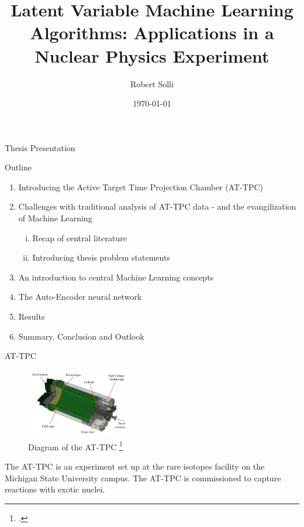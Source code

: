 \documentclass[notes]{beamer}
\title{Latent Variable Machine Learning Algorithms: Applications in a Nuclear Physics Experiment
}
\author{Robert Solli}
\institute{University of Oslo, Expert Analytics AS}
\date{\today}
\begin{document}
\begin{frame}[t]{Thesis Presentation}
	\titlepage
\end{frame}

\begin{frame}[t]{Outline}
	\begin{enumerate}
		\item Introducing the Active Target Time Projection Chamber (AT-TPC)
		\item Challenges with traditional analysis of AT-TPC data - and the evangilization of Machine Learning
			\begin{enumerate}[(i)]
				\item Recap of central literature 
				\item Introducing thesis problem statements
			\end{enumerate}
		\item An introduction to central Machine Learning concepts
		\item The Auto-Encoder neural network
		\item Results 
		\item Summary, Conclusion and Outlook
	\end{enumerate}
\end{frame}

\begin{frame}[t]{AT-TPC}
	\begin{figure}
		\centering
		\includegraphics[height=3cm]{../chapters/experimental_background/plots/at_tpc_schematic.png}
		\caption{Diagram of the AT-TPC \footcite{Bradt2017a}}\label{fig:attpc}
	\end{figure}
	The AT-TPC is an experiment set up at the rare isotopes facility on the Michigan State University campus. The AT-TPC is commissioned to capture reactions with exotic nuclei.
\end{frame}
\end{document}
